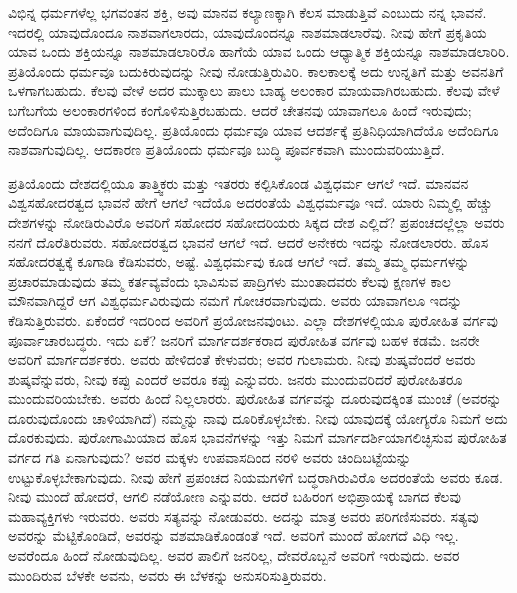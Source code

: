 \vskip 5pt

ವಿಭಿನ್ನ ಧರ್ಮಗಳೆಲ್ಲ ಭಗವಂತನ ಶಕ್ತಿ, ಅವು ಮಾನವ ಕಲ್ಯಾಣಕ್ಕಾಗಿ ಕೆಲಸ ಮಾಡುತ್ತಿವೆ ಎಂಬುದು ನನ್ನ ಭಾವನೆ. ಇದರಲ್ಲಿ ಯಾವುದೊಂದೂ ನಾಶವಾಗಲಾರದು, ಯಾವುದೊಂದನ್ನೂ ನಾಶಮಾಡಲಾರೆವು. ನೀವು ಹೇಗೆ ಪ್ರಕೃತಿಯ ಯಾವ ಒಂದು ಶಕ್ತಿಯನ್ನೂ ನಾಶಮಾಡಲಾರಿರೊ ಹಾಗೆಯೆ ಯಾವ ಒಂದು ಆಧ್ಯಾತ್ಮಿಕ ಶಕ್ತಿಯನ್ನೂ ನಾಶಮಾಡಲಾರಿರಿ. ಪ್ರತಿಯೊಂದು ಧರ್ಮವೂ ಬದುಕಿರುವುದನ್ನು ನೀವು ನೋಡುತ್ತಿರುವಿರಿ. ಕಾಲಕಾಲಕ್ಕೆ ಅದು ಉನ್ನತಿಗೆ ಮತ್ತು ಅವನತಿಗೆ ಒಳಗಾಗಬಹುದು. ಕೆಲವು ವೇಳೆ ಅದರ ಮುಕ್ಕಾಲು ಪಾಲು ಬಾಹ್ಯ ಅಲಂಕಾರ ಮಾಯವಾಗಿರಬಹುದು. ಕೆಲವು ವೇಳೆ ಬಗೆಬಗೆಯ ಅಲಂಕಾರಗಳಿಂದ ಕಂಗೊಳಿಸುತ್ತಿರಬಹುದು. ಆದರೆ ಚೇತನವು ಯಾವಾಗಲೂ ಹಿಂದೆ ಇರುವುದು; ಅದೆಂದಿಗೂ ಮಾಯವಾಗುವುದಿಲ್ಲ. ಪ್ರತಿಯೊಂದು ಧರ್ಮವೂ ಯಾವ ಆದರ್ಶಕ್ಕೆ ಪ್ರತಿನಿಧಿಯಾಗಿದೆಯೊ ಅದೆಂದಿಗೂ ನಾಶವಾಗುವುದಿಲ್ಲ. ಆದಕಾರಣ ಪ್ರತಿಯೊಂದು ಧರ್ಮವೂ ಬುದ್ಧಿ ಪೂರ್ವಕವಾಗಿ ಮುಂದುವರಿಯುತ್ತಿದೆ.

\vskip 5pt

ಪ್ರತಿಯೊಂದು ದೇಶದಲ್ಲಿಯೂ ತಾತ್ತ್ವಿಕರು ಮತ್ತು ಇತರರು ಕಲ್ಪಿಸಿಕೊಂಡ ವಿಶ್ವಧರ್ಮ ಆಗಲೆ ಇದೆ. ಮಾನವನ ವಿಶ್ವಸಹೋದರತ್ವದ ಭಾವನೆ ಹೇಗೆ ಆಗಲೆ ಇದೆಯೊ ಅದರಂತೆಯೆ ವಿಶ್ವಧರ್ಮವೂ ಇದೆ. ಯಾರು ನಿಮ್ಮಲ್ಲಿ ಹೆಚ್ಚು ದೇಶಗಳನ್ನು ನೋಡಿರುವಿರೊ ಅವರಿಗೆ ಸಹೋದರ ಸಹೋದರಿಯರು ಸಿಕ್ಕದ ದೇಶ ಎಲ್ಲಿದೆ? ಪ್ರಪಂಚದಲ್ಲೆಲ್ಲಾ ಅವರು ನನಗೆ ದೊರೆತಿರುವರು. ಸಹೋದರತ್ವದ ಭಾವನೆ ಆಗಲೆ ಇದೆ. ಆದರೆ ಅನೇಕರು ಇದನ್ನು ನೋಡಲಾರರು. ಹೊಸ ಸಹೋದರತ್ವಕ್ಕೆ ಕೂಗಾಡಿ ಕೆಡಿಸುವರು, ಅಷ್ಟೆ. ವಿಶ್ವಧರ್ಮವು ಕೂಡ ಆಗಲೆ ಇದೆ. ತಮ್ಮ ತಮ್ಮ ಧರ್ಮಗಳನ್ನು ಪ್ರಚಾರಮಾಡುವುದು ತಮ್ಮ ಕರ್ತವ್ಯವೆಂದು ಭಾವಿಸುವ ಪಾದ್ರಿಗಳು ಮುಂತಾದವರು ಕೆಲವು ಕ್ಷಣಗಳ ಕಾಲ ಮೌನವಾಗಿದ್ದರೆ ಆಗ ವಿಶ್ವಧರ್ಮವಿರುವುದು ನಮಗೆ ಗೋಚರವಾಗುವುದು. ಅವರು ಯಾವಾಗಲೂ ಇದನ್ನು ಕೆಡಿಸುತ್ತಿರುವರು. ಏಕೆಂದರೆ ಇದರಿಂದ ಅವರಿಗೆ ಪ್ರಯೋಜನವುಂಟು. ಎಲ್ಲಾ ದೇಶಗಳಲ್ಲಿಯೂ ಪುರೋಹಿತ ವರ್ಗವು ಪೂರ್ವಾಚಾರಬದ್ಧರು. ಇದು ಏಕೆ? ಜನರಿಗೆ ಮಾರ್ಗದರ್ಶಕರಾದ ಪುರೋಹಿತ ವರ್ಗವು ಬಹಳ ಕಡಮೆ. ಜನರೇ ಅವರಿಗೆ ಮಾರ್ಗದರ್ಶಕರು. ಅವರು ಹೇಳಿದಂತೆ ಕೇಳುವರು; ಅವರ ಗುಲಾಮರು. ನೀವು ಶುಷ್ಕವೆಂದರೆ ಅವರು ಶುಷ್ಕವೆನ್ನುವರು, ನೀವು ಕಪ್ಪು ಎಂದರೆ ಅವರೂ ಕಪ್ಪು ಎನ್ನುವರು. ಜನರು ಮುಂದುವರಿದರೆ ಪುರೋಹಿತರೂ ಮುಂದುವರಿಯಬೇಕು. ಅವರು ಹಿಂದೆ ನಿಲ್ಲಲಾರರು. ಪುರೋಹಿತ ವರ್ಗವನ್ನು ದೂರುವುದಕ್ಕಿಂತ ಮುಂಚೆ (ಅವರನ್ನು ದೂರುವುದೊಂದು ಚಾಳಿಯಾಗಿದೆ) ನಮ್ಮನ್ನು ನಾವು ದೂರಿಕೊಳ್ಳಬೇಕು. ನೀವು ಯಾವುದಕ್ಕೆ ಯೋಗ್ಯರೊ ನಿಮಗೆ ಅದು ದೊರಕುವುದು. ಪುರೋಗಾಮಿಯಾದ ಹೊಸ ಭಾವನೆಗಳನ್ನು ಇತ್ತು ನಿಮಗೆ ಮಾರ್ಗದರ್ಶಿಯಾಗಲಿಚ್ಛಿಸುವ ಪುರೋಹಿತ ವರ್ಗದ ಗತಿ ಏನಾಗುವುದು? ಅವರ ಮಕ್ಕಳು ಉಪವಾಸದಿಂದ ನರಳಿ ಅವರು ಚಿಂದಿಬಟ್ಟೆಯನ್ನು ಉಟ್ಟುಕೊಳ್ಳಬೇಕಾಗುವುದು. ನೀವು ಹೇಗೆ ಪ್ರಪಂಚದ ನಿಯಮಗಳಿಗೆ ಬದ್ಧರಾಗಿರುವಿರೊ ಅದರಂತೆಯೆ ಅವರು ಕೂಡ. ನೀವು ಮುಂದೆ ಹೋದರೆ, ಆಗಲಿ ನಡೆಯೋಣ ಎನ್ನುವರು. ಆದರೆ ಬಹಿರಂಗ ಅಭಿಪ್ರಾಯಕ್ಕೆ ಬಾಗದ ಕೆಲವು ಮಹಾವ್ಯಕ್ತಿಗಳು ಇರುವರು. ಅವರು ಸತ್ಯವನ್ನು ನೋಡುವರು. ಅದನ್ನು ಮಾತ್ರ ಅವರು ಪರಿಗಣಿಸುವರು. ಸತ್ಯವು ಅವರನ್ನು ಮೆಟ್ಟಿಕೊಂಡಿದೆ, ಅವರನ್ನು ವಶಮಾಡಿಕೊಂಡಂತೆ ಇದೆ. ಅವರಿಗೆ ಮುಂದೆ ಹೋಗದೆ ವಿಧಿ ಇಲ್ಲ. ಅವರೆಂದೂ ಹಿಂದೆ ನೋಡುವುದಿಲ್ಲ. ಅವರ ಪಾಲಿಗೆ ಜನರಿಲ್ಲ, ದೇವರೊಬ್ಬನೆ ಅವರಿಗೆ ಇರುವುದು. ಅವರ ಮುಂದಿರುವ ಬೆಳಕೇ ಅವನು, ಅವರು ಈ ಬೆಳಕನ್ನು ಅನುಸರಿಸುತ್ತಿರುವರು.

\newpage

